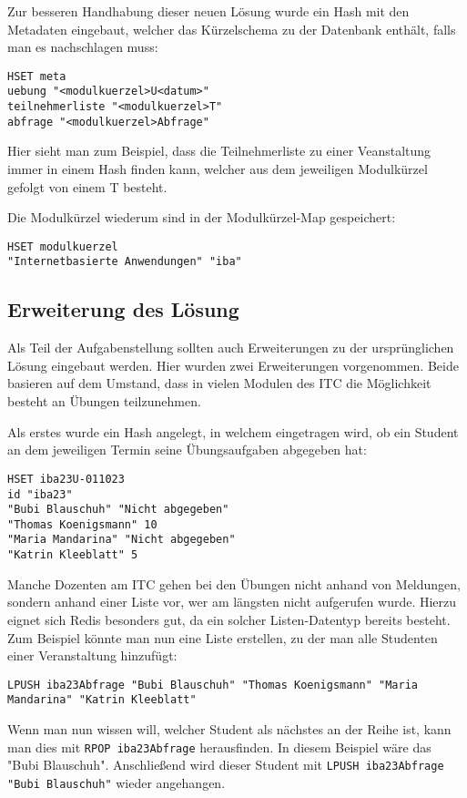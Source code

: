 \vspace{6pt}

Zur besseren Handhabung dieser neuen Lösung wurde  ein Hash mit den Metadaten eingebaut, welcher das Kürzelschema zu der Datenbank enthält, falls man es nachschlagen muss:
\begin{lstlisting}
HSET meta 
uebung "<modulkuerzel>U<datum>" 
teilnehmerliste "<modulkuerzel>T" 
abfrage "<modulkuerzel>Abfrage"
\end{lstlisting}
Hier sieht man zum Beispiel, dass die Teilnehmerliste zu einer Veanstaltung immer in einem Hash finden kann, welcher aus dem jeweiligen Modulkürzel gefolgt von einem T besteht.

\vspace{6pt}

Die Modulkürzel wiederum sind in der Modulkürzel-Map gespeichert:
\begin{lstlisting}
HSET modulkuerzel 
"Internetbasierte Anwendungen" "iba"
\end{lstlisting}

\newpage

\subsection{Erweiterung des Lösung}
Als Teil der Aufgabenstellung sollten auch Erweiterungen zu der ursprünglichen Lösung eingebaut werden. Hier wurden zwei Erweiterungen vorgenommen. Beide basieren auf dem Umstand, dass in vielen Modulen des ITC die Möglichkeit besteht an Übungen teilzunehmen.

\vspace{6pt}

Als erstes wurde ein Hash angelegt, in welchem eingetragen wird, ob ein Student an dem jeweiligen Termin seine Übungsaufgaben abgegeben hat:
\begin{lstlisting}
HSET iba23U-011023 
id "iba23" 
"Bubi Blauschuh" "Nicht abgegeben" 
"Thomas Koenigsmann" 10 
"Maria Mandarina" "Nicht abgegeben" 
"Katrin Kleeblatt" 5
\end{lstlisting}

Manche Dozenten am ITC gehen bei den Übungen nicht anhand von Meldungen, sondern anhand einer Liste vor, wer am längsten nicht aufgerufen wurde. Hierzu eignet sich Redis besonders gut, da ein solcher Listen-Datentyp bereits besteht. Zum Beispiel könnte man nun eine Liste erstellen, zu der man alle Studenten einer Veranstaltung hinzufügt:
\begin{lstlisting}
LPUSH iba23Abfrage "Bubi Blauschuh" "Thomas Koenigsmann" "Maria Mandarina" "Katrin Kleeblatt"
\end{lstlisting}

Wenn man nun wissen will, welcher Student als nächstes an der Reihe ist, kann man dies mit \texttt{RPOP iba23Abfrage} herausfinden. In diesem Beispiel wäre das "Bubi Blauschuh". Anschließend wird dieser Student mit \texttt{LPUSH iba23Abfrage "Bubi Blauschuh"} wieder angehangen.





